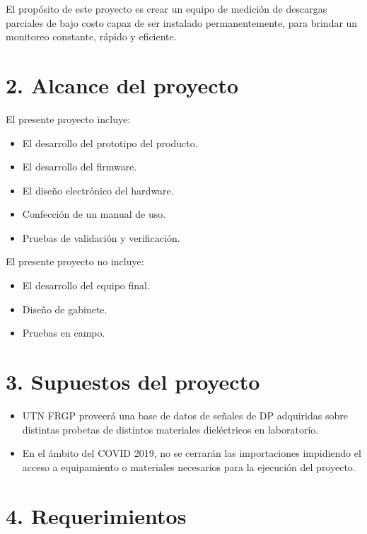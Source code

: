 \documentclass[11pt]{charter}
\begin{document}
El propósito de este proyecto es crear un equipo de medición de descargas parciales de bajo costo capaz de ser instalado permanentemente, para brindar un monitoreo constante, rápido y eficiente.

\section{2. Alcance del proyecto}
\label{sec:alcance}

El presente proyecto incluye:
\begin{itemize}
\item El desarrollo del prototipo del producto.
\item El desarrollo del firmware.
\item El diseño electrónico del hardware.
\item Confección de un manual de uso.
\item Pruebas de validación y verificación.
\end{itemize}

El presente proyecto no incluye:
\begin{itemize}
\item El desarrollo del equipo final.
\item Diseño de gabinete.
\item Pruebas en campo.
\end{itemize}


\section{3. Supuestos del proyecto}
\label{sec:supuestos}

\begin{itemize}
\item UTN FRGP proveerá una base de datos de señales de DP adquiridas sobre distintas probetas de distintos materiales dieléctricos en laboratorio. 
\item En el ámbito del COVID 2019, no se cerrarán las importaciones impidiendo el acceso a equipamiento o materiales necesarios para la ejecución del proyecto.
\end{itemize}

\section{4. Requerimientos}
\label{sec:requerimientos}
\end{document}
